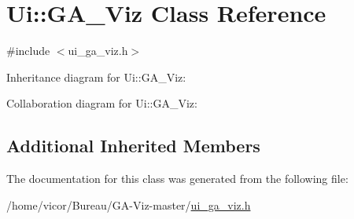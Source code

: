 \hypertarget{class_ui_1_1_g_a___viz}{}\section{Ui\+:\+:G\+A\+\_\+\+Viz Class Reference}
\label{class_ui_1_1_g_a___viz}


{\ttfamily \#include $<$ui\+\_\+ga\+\_\+viz.\+h$>$}



Inheritance diagram for Ui\+:\+:G\+A\+\_\+\+Viz\+:


Collaboration diagram for Ui\+:\+:G\+A\+\_\+\+Viz\+:
\subsection*{Additional Inherited Members}


The documentation for this class was generated from the following file\+:\begin{DoxyCompactItemize}
\item 
/home/vicor/\+Bureau/\+G\+A-\/\+Viz-\/master/\hyperlink{ui__ga__viz_8h}{ui\+\_\+ga\+\_\+viz.\+h}\end{DoxyCompactItemize}
